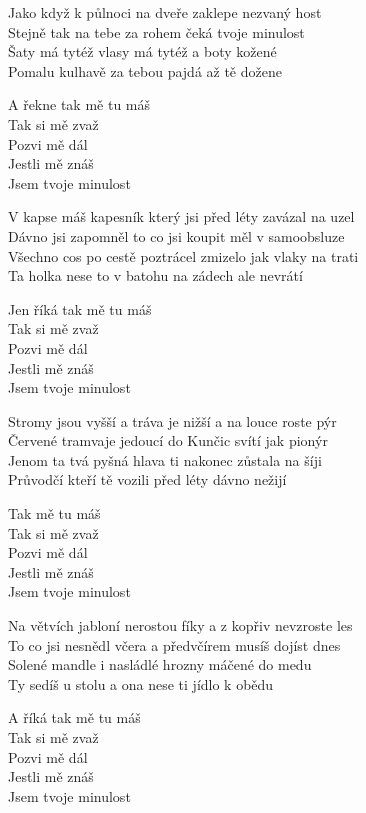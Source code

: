 \begin{text}
Jako když k půlnoci na dveře zaklepe nezvaný host\\
Stejně tak na tebe za rohem čeká tvoje minulost \\
Šaty má tytéž vlasy má tytéž a boty kožené\\
Pomalu kulhavě za tebou pajdá až tě dožene

A řekne tak mě tu máš \\
Tak si mě zvaž\\
Pozvi mě dál \\
Jestli mě znáš\\
Jsem tvoje minulost

V kapse máš kapesník který jsi před léty zavázal na uzel\\
Dávno jsi zapomněl to co jsi koupit měl v samoobsluze\\
Všechno cos po cestě poztrácel zmizelo jak vlaky na trati\\
Ta holka nese to v batohu na zádech ale nevrátí

Jen říká tak mě tu máš \\
Tak si mě zvaž\\
Pozvi mě dál \\
Jestli mě znáš\\
Jsem tvoje minulost

Stromy jsou vyšší a tráva je nižší a na louce roste pýr\\
Červené tramvaje jedoucí do Kunčic svítí jak pionýr\\
Jenom ta tvá pyšná hlava ti nakonec zůstala na šíji\\
Průvodčí kteří tě vozili před léty dávno nežijí

Tak mě tu máš \\
Tak si mě zvaž\\
Pozvi mě dál \\
Jestli mě znáš\\
Jsem tvoje minulost

Na větvích jabloní nerostou fíky a z kopřiv nevzroste les\\
To co jsi nesnědl včera a předvčírem musíš dojíst dnes\\
Solené mandle i nasládlé hrozny máčené do medu\\
Ty sedíš u stolu a ona nese ti jídlo k obědu

A říká tak mě tu máš \\
Tak si mě zvaž\\
Pozvi mě dál \\
Jestli mě znáš\\
Jsem tvoje minulost


\end{text}
